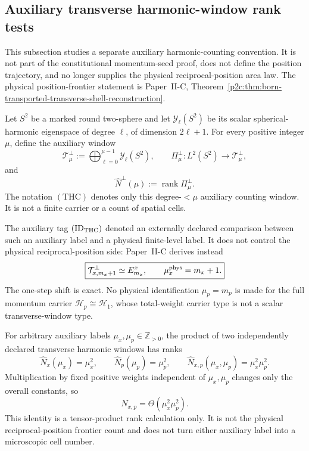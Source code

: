 \documentclass[11pt,a4paper]{article}
\begin{document}
\subsection{Auxiliary transverse harmonic-window rank tests}
\label{p3b:app:thc}
This subsection studies a separate auxiliary harmonic-counting
convention.  It is not part of the constitutional momentum-seed proof, does
not define the position trajectory, and no longer supplies the physical
reciprocal-position area law.  The physical position-frontier statement is
Paper~II-C,
Theorem~\ref{p2c:thm:born-transported-transverse-shell-reconstruction}.

\begin{definition}
\label{p3:def:transverse-harmonic-cell-normalization}
Let \(S^2\) be a marked round two-sphere and let
\(\mathscr Y_\ell(S^2)\) be its scalar spherical-harmonic eigenspace of degree
\(\ell\), of dimension \(2\ell+1\).  For every positive integer \(\mu\),
define the auxiliary window
\[
 \mathcal T_\mu^\perp
 :=\bigoplus_{\ell=0}^{\mu-1}\mathscr Y_\ell(S^2),
 \qquad
 \Pi_\mu^\perp:L^2(S^2)\longrightarrow\mathcal T_\mu^\perp,
\]
and
\[
 \widehat N^\perp(\mu):=\operatorname{rank}\Pi_\mu^\perp.
\]
The notation \((\mathrm{THC})\) denotes only this degree-\(<\mu\)
auxiliary counting window.  It is not a finite carrier or a count of spatial
cells.

The auxiliary tag \((\mathrm{ID}_{\rm THC})\) denoted an externally declared
comparison between such an auxiliary label and a physical finite-level label.
It does not control the physical reciprocal-position side:  Paper~II-C
derives instead
\[
 \boxed{\mathcal T_{x,m_x+1}^{\perp}\simeq E_{m_x}^x,\qquad
        \mu_x^{\rm phys}=m_x+1.}
\]
The one-step shift is exact.  No physical identification
\(\mu_p=m_p\) is made for the full momentum carrier
\(\mathcal H_p\cong\mathcal H_1\), whose total-weight carrier type is not a
scalar transverse-window type.
\end{definition}

\begin{theorem}
\label{p3:thm:two-cutoff-holographic-scaling}
For arbitrary auxiliary labels \(\mu_x,\mu_p\in\mathbb Z_{>0}\), the product
of two independently declared transverse harmonic windows has ranks
\[
 \widehat N_x(\mu_x)=\mu_x^2,
 \qquad
 \widehat N_p(\mu_p)=\mu_p^2,
 \qquad
 \widehat N_{x,p}(\mu_x,\mu_p)=\mu_x^2\mu_p^2.
\]
Multiplication by fixed positive weights independent of \(\mu_x,\mu_p\)
changes only the overall constants, so
\[
 N_{x,p}=\Theta(\mu_x^2\mu_p^2).
\]
This identity is a tensor-product rank calculation only.  It is not the
physical reciprocal-position frontier count and does not turn either
auxiliary label into a microscopic cell number.
\end{theorem}
\end{document}
